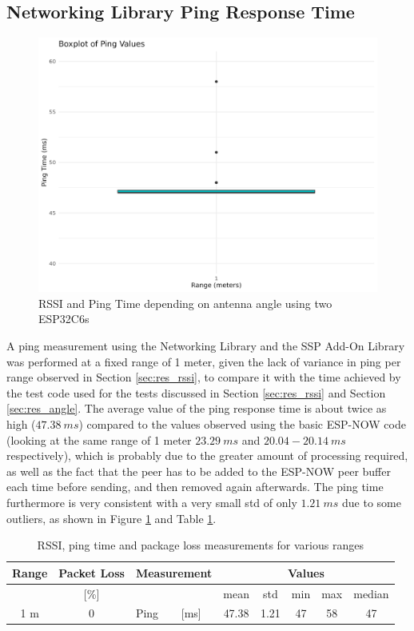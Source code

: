 \subsection{\label{sec:res_ping}Networking Library Ping Response Time}

\begin{figure}[H]
    \centering
    \includegraphics[width=.45\textwidth]{rstudio/analysis/plots/ping_net_ping.png}
    \vspace{\ftspace}
    \caption{RSSI and Ping Time depending on antenna angle using two ESP32C6s}
    \label{fig:net_ping}
\end{figure}

A ping measurement using the Networking Library and the SSP Add-On Library was performed at a fixed range of 1 meter, given the lack of variance in ping per range observed in Section \ref{sec:res_rssi}, to compare it with the time achieved by the test code used for the tests discussed in Section \ref{sec:res_rssi} and Section \ref{sec:res_angle}. The average value of the ping response time is about twice as high ($47.38\ ms$) compared to the values observed using the basic ESP-NOW code (looking at the same range of 1 meter $23.29\ ms$ and $20.04-20.14\ ms$ respectively), which is probably due to the greater amount of processing required, as well as the fact that the peer has to be added to the ESP-NOW peer buffer each time before sending, and then removed again afterwards. The ping time furthermore is very consistent with a very small std of only $1.21\ ms$ due to some outliers, as shown in Figure \ref{fig:net_ping} and Table \ref{tab:ping}. 

\begin{table}[H]
    \centering
    \begin{tabular}{|c|c|l|l|c|c|c|c|c|}
    \hline
        Range & Packet Loss & \multicolumn{2}{l|}{Measurement} & \multicolumn{5}{c|}{Values} \\\hline
        [meters] & [\%] & \multicolumn{2}{l|}{} & mean & std & min & max & median \\\hline\hline
        1 m & 0 & Ping & [ms] & 47.38 & 1.21 & 47 & 58 & 47 \\\hline
    \end{tabular}
    \vspace{\ftspace}
    \caption{RSSI, ping time and package loss measurements for various ranges}
    \label{tab:ping}
\end{table}


